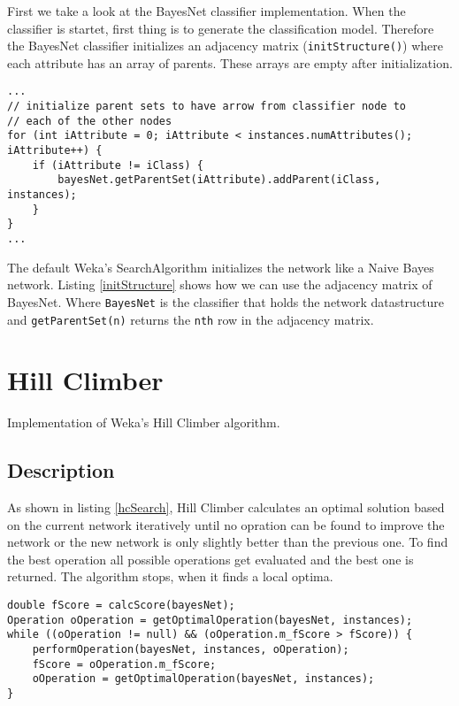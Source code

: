 \documentclass[paper=a4, fontsize=11pt]{scrartcl} %
\numberwithin{equation}{section} %
\numberwithin{figure}{section} %
\numberwithin{table}{section} %
\begin{document}
First we take a look at the BayesNet classifier implementation. When the classifier is startet, first thing is to generate the classification model. Therefore the BayesNet classifier initializes an adjacency matrix (\texttt{initStructure()}) where each attribute has an array of parents. These arrays are empty after initialization. 


\begin{lstlisting}[caption={Initialization of BayesNet},label=initStructure]
...
// initialize parent sets to have arrow from classifier node to
// each of the other nodes
for (int iAttribute = 0; iAttribute < instances.numAttributes(); iAttribute++) {
    if (iAttribute != iClass) {
        bayesNet.getParentSet(iAttribute).addParent(iClass, instances);
    }
}
...
\end{lstlisting}

The default Weka's SearchAlgorithm initializes the network like a Naive Bayes network. Listing \ref{initStructure} shows how we can use the adjacency matrix of BayesNet. Where \texttt{BayesNet} is the classifier that holds the network datastructure and \texttt{getParentSet(n)} returns the \texttt{nth} row in the adjacency matrix.

%
%
%
\section{Hill Climber}

Implementation of Weka's Hill Climber algorithm.

%
%
\subsection{Description}

As shown in listing \ref{hcSearch}, Hill Climber calculates an optimal solution based on the current network iteratively until no opration can be found to improve the network or the new network is only slightly better than the previous one. To find the best operation all possible operations get evaluated and the best one is returned. The algorithm stops, when it finds a local optima.

\begin{lstlisting}[caption={HillClimbers search algorithm},label=hcSearch]
double fScore = calcScore(bayesNet);
Operation oOperation = getOptimalOperation(bayesNet, instances);
while ((oOperation != null) && (oOperation.m_fScore > fScore)) {
	performOperation(bayesNet, instances, oOperation);
	fScore = oOperation.m_fScore;
	oOperation = getOptimalOperation(bayesNet, instances);
}  
\end{lstlisting}
\end{document}
